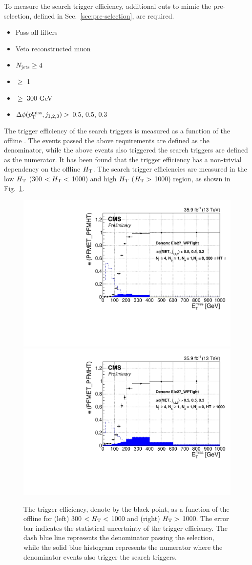 To measure the search trigger efficiency, additional cuts to mimic the
pre-selection, defined in Sec.~\ref{sec:pre-selection}, are required.
\begin{itemize}
  \item Pass all filters
  \item Veto reconstructed muon
  \item $N_{\text{jets}}\geq4$
  \item \nbjets $\ge$ 1
  \item \HT $\ge$ 300 GeV
  \item $\Delta\phi(p^{\rm miss}_{\rm T}, j_{1,2,3})>$ 0.5, 0.5, 0.3
\end{itemize}

The trigger efficiency of the search triggers is measured as a function of
the offline \MET.  The events passed the above requirements are defined as the
denominator, while the above events also triggered the search triggers are
defined as the numerator. It has been found that the \MET trigger efficiency
has a non-trivial dependency on the offline $H_{\mathrm{T}}$. The search trigger
efficiencies are measured in the low $H_{\mathrm{T}}$ (300 $< H_{\mathrm{T}} <$ 1000) and high
$H_{\mathrm{T}}$ ($H_{\mathrm{T}} >$ 1000) region, as shown in Fig.~\ref{fig:TrigMET}.
\begin{figure}[tbp]
 \begin{center}
   \includegraphics[width=0.49\linewidth]{sections/mc4/EvtSelSBOpt/figures/TrigEle_Stop_TrigMET_HTLess1000_9.pdf}
   \includegraphics[width=0.49\linewidth]{sections/mc4/EvtSelSBOpt/figures/TrigEle_Stop_TrigMET_HTMore1000_9.pdf}
   \caption{ The trigger efficiency, denote by the black point, as a function
   of the offline \MET for (left) 300 $< H_{\mathrm{T}} <$ 1000 and (right) $H_{\mathrm{T}} >$ 1000.
   The error bar indicates the statistical uncertainty of the trigger
   efficiency. The dash blue line represents the denominator passing the
   selection, while the solid blue histogram represents the numerator where
   the denominator events also trigger the search triggers. }
   \label{fig:TrigMET}
 \end{center}
\end{figure}

